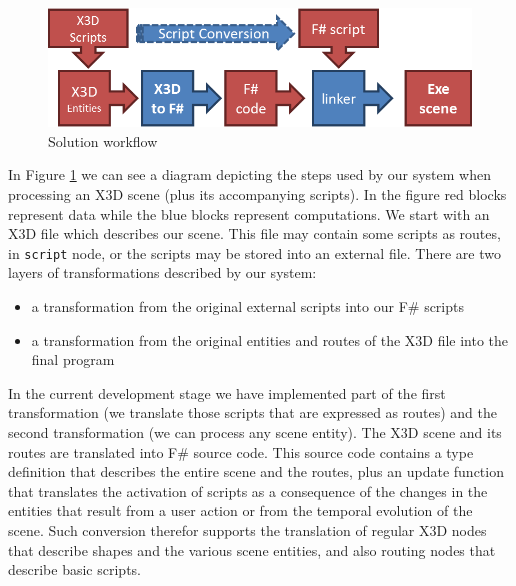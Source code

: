 
\begin{figure}
\begin{center}
\includegraphics[scale=0.6]{Solution_workflow.png}
\end{center}
\label{fig:solution_workflow}
\caption{Solution workflow}
\end{figure}

In Figure \ref{fig:solution_workflow} we can see a diagram depicting the steps used by our system when processing an X3D scene (plus its accompanying scripts). In the figure red blocks represent data while the blue blocks represent computations.
We start with an X3D file which describes our scene. This file may contain some scripts as routes, in \texttt{script} node, or the scripts may be stored into an external file. There are two layers of transformations described by our system:

\begin{itemize}
\addtolength{\itemsep}{-0.5\baselineskip}
\item a transformation from the original external scripts into our F\# scripts
\item a transformation from the original entities and routes of the X3D file into the final program
\end{itemize}

In the current development stage we have implemented part of the first transformation (we translate those scripts that are expressed as routes) and the second transformation (we can process any scene entity). The X3D scene and its routes are translated into F\# source code. This source code contains a type definition that describes the entire scene and the routes, plus an update function that translates the activation of scripts as a consequence of the changes in the entities that result from a user action or from the temporal evolution of the scene. Such conversion therefor supports the translation of regular X3D nodes that describe shapes and the various scene entities, and also routing nodes that describe basic scripts.

